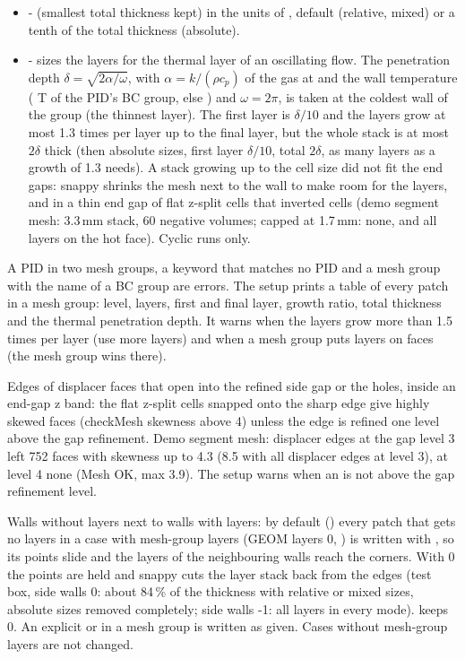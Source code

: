 \begin{itemize}
    \item {} -  (smallest total thickness kept) in the units of , default  (relative, mixed) or a tenth of the total thickness (absolute).
    \item {} - sizes the layers for the thermal layer of an oscillating flow. The penetration depth $\delta = \sqrt{2\alpha/\omega}$, with $\alpha = k/(\rho c_p)$ of the gas at  and the wall temperature ( T of the PID's BC group, else ) and $\omega = 2\pi$, is taken at the coldest wall of the group (the thinnest layer). The first layer is $\delta/10$ and the layers grow at most 1.3 times per layer up to the final layer, but the whole stack is at most $2\delta$ thick (then absolute sizes, first layer $\delta/10$, total $2\delta$, as many layers as a growth of 1.3 needs). A stack growing up to the cell size did not fit the end gaps: snappy shrinks the mesh next to the wall to make room for the layers, and in a thin end gap of flat z-split cells that inverted cells (demo segment mesh: 3.3\,mm stack, 60 negative volumes; capped at 1.7\,mm: none, and all layers on the hot face). Cyclic runs only.
\end{itemize}
A PID in two mesh groups, a keyword that matches no PID and a mesh group with the name of a BC group are errors. The setup prints a table of every patch in a mesh group: level, layers, first and final layer, growth ratio, total thickness and the thermal penetration depth. It warns when the layers grow more than 1.5 times per layer (use more layers) and when a mesh group puts layers on  faces (the mesh group wins there).

Edges of displacer faces that open into the refined side gap or the holes, inside an end-gap z band: the flat z-split cells snapped onto the sharp edge give highly skewed faces (checkMesh skewness above 4) unless the edge is refined one level above the gap refinement. Demo segment mesh: displacer edges at the gap level 3 left 752 faces with skewness up to 4.3 (8.5 with all displacer edges at level 3), at level 4 none (Mesh OK, max 3.9). The setup warns when an  is not above the gap refinement level.

Walls without layers next to walls with layers: by default () every patch that gets no layers in a case with mesh-group layers (GEOM layers 0, ) is written with , so its points slide and the layers of the neighbouring walls reach the corners. With 0 the points are held and snappy cuts the layer stack back from the edges (test box, side walls 0: about 84\,\% of the thickness with relative or mixed sizes, absolute sizes removed completely; side walls -1: all layers in every mode).  keeps 0. An explicit  or  in a mesh group is written as given. Cases without mesh-group layers are not changed.


